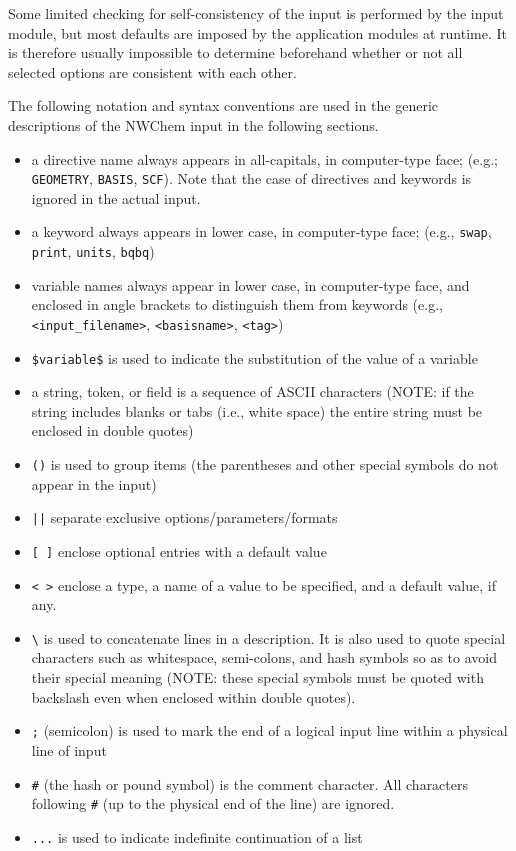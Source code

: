 Some limited checking for self-consistency of the input is performed
by the input module, but most defaults are imposed by the application
modules at runtime.  It is therefore usually impossible to determine
beforehand whether or not all selected options are consistent with each
other.

The following notation and syntax conventions are used in the generic 
descriptions of the NWChem input in the following sections.

\begin{itemize}
\item a directive name always appears in all-capitals, in computer-type 
face; (e.g.; \verb+GEOMETRY+, \verb+BASIS+, \verb+SCF+).  Note that 
the case of directives and keywords is ignored in the actual input.
\item a keyword always appears in lower case, in computer-type face; (e.g.,
{\tt swap}, {\tt print}, {\tt units}, {\tt bqbq})
\item variable names always appear in lower case, in computer-type face, 
and enclosed in angle brackets to distinguish them from keywords (e.g.,
{\tt <input\_filename>}, {\tt <basisname>}, {\tt <tag>})
\item \verb+$variable$+ is used to indicate the substitution of the value of a
      variable
\item a string, token, or field is a sequence of ASCII characters (NOTE: if 
the string includes blanks or tabs (i.e., white space) the entire string must
be enclosed in double quotes)
\item \verb+()+ is used to group items (the parentheses and other
      special symbols do not appear in the input)
\item \verb+||+ separate exclusive options/parameters/formats
\item \verb+[ ]+ enclose optional entries with a default value
\item \verb+< >+ enclose a type, a name of a value to be specified,
      and a default value, if any.

\item \verb+\+ is used to concatenate lines in a description.  It is
also used to quote special characters such as whitespace, semi-colons,
and hash symbols so as to avoid their special meaning (NOTE: these
special symbols must be quoted with backslash even when enclosed
within double quotes).

\item \verb+;+ (semicolon) is used to mark the end of a logical input 
line within a physical line of input
\item \verb+#+ (the hash or pound symbol) is the comment character.  All
characters following \verb+#+ (up to the physical end of the line) are ignored.

\item \verb+...+ is used to indicate indefinite continuation of a list
\end{itemize}

